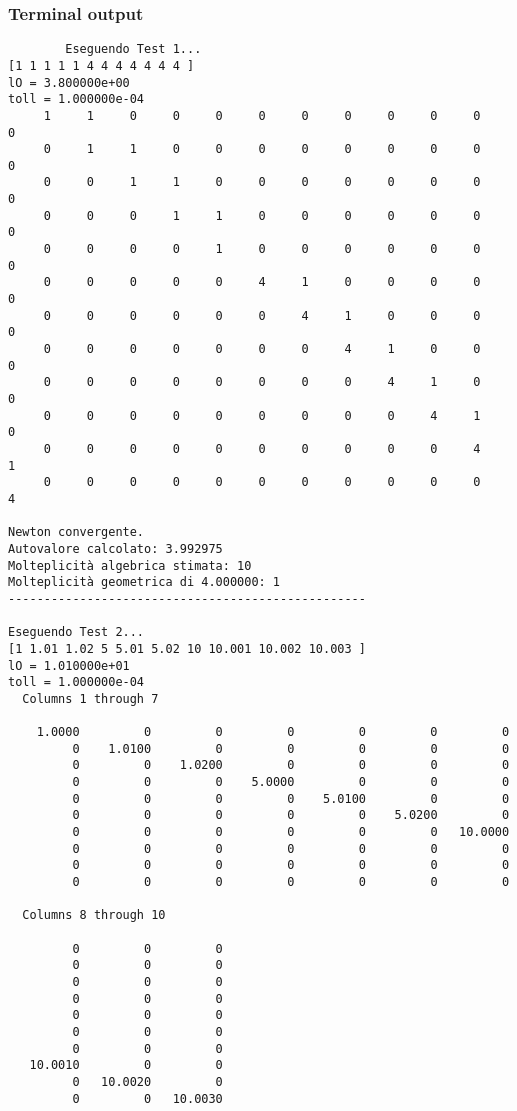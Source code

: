 \documentclass[12pt]{article}
\begin{document}
    \subsubsection{Terminal output}
    \begin{verbatim}
        Eseguendo Test 1...
[1 1 1 1 1 4 4 4 4 4 4 4 ]
lO = 3.800000e+00
toll = 1.000000e-04
     1     1     0     0     0     0     0     0     0     0     0     0
     0     1     1     0     0     0     0     0     0     0     0     0
     0     0     1     1     0     0     0     0     0     0     0     0
     0     0     0     1     1     0     0     0     0     0     0     0
     0     0     0     0     1     0     0     0     0     0     0     0
     0     0     0     0     0     4     1     0     0     0     0     0
     0     0     0     0     0     0     4     1     0     0     0     0
     0     0     0     0     0     0     0     4     1     0     0     0
     0     0     0     0     0     0     0     0     4     1     0     0
     0     0     0     0     0     0     0     0     0     4     1     0
     0     0     0     0     0     0     0     0     0     0     4     1
     0     0     0     0     0     0     0     0     0     0     0     4

Newton convergente.
Autovalore calcolato: 3.992975
Molteplicità algebrica stimata: 10
Molteplicità geometrica di 4.000000: 1
--------------------------------------------------

Eseguendo Test 2...
[1 1.01 1.02 5 5.01 5.02 10 10.001 10.002 10.003 ]
lO = 1.010000e+01
toll = 1.000000e-04
  Columns 1 through 7

    1.0000         0         0         0         0         0         0
         0    1.0100         0         0         0         0         0
         0         0    1.0200         0         0         0         0
         0         0         0    5.0000         0         0         0
         0         0         0         0    5.0100         0         0
         0         0         0         0         0    5.0200         0
         0         0         0         0         0         0   10.0000
         0         0         0         0         0         0         0
         0         0         0         0         0         0         0
         0         0         0         0         0         0         0

  Columns 8 through 10

         0         0         0
         0         0         0
         0         0         0
         0         0         0
         0         0         0
         0         0         0
         0         0         0
   10.0010         0         0
         0   10.0020         0
         0         0   10.0030


\end{verbatim}
\end{document}
